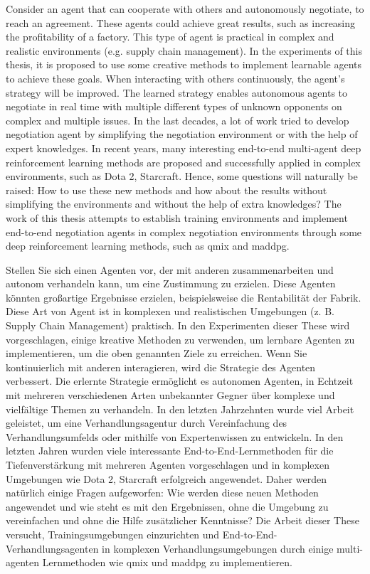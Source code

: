 
Consider an agent that can cooperate with others and autonomously negotiate, to reach an agreement. These agents could achieve great results, such as increasing the profitability of a factory. This type of agent is practical in complex and realistic environments (e.g. supply chain management). In the experiments of this thesis, it is proposed to use some creative methods to implement learnable agents to achieve these goals. When interacting with others continuously, the agent’s strategy will be improved. The learned strategy enables autonomous agents to negotiate in real time with multiple different types of unknown opponents on complex and multiple issues. In the last decades, a lot of work tried to develop negotiation agent by simplifying the negotiation environment or with the help of expert knowledges. In recent years, many interesting end-to-end multi-agent deep reinforcement learning methods are proposed and successfully applied in complex environments, such as Dota 2, Starcraft. Hence, some questions will naturally be raised: How to use these new methods and how about the results without simplifying the environments and without the help of extra knowledges? The work of this thesis attempts to establish training environments and implement end-to-end negotiation agents in complex negotiation environments through some deep reinforcement learning methods, such as \gls{qmix} and \gls{maddpg}.


Stellen Sie sich einen Agenten vor, der mit anderen zusammenarbeiten und autonom verhandeln kann, um eine Zustimmung zu erzielen. Diese Agenten könnten großartige Ergebnisse erzielen, beispielsweise die Rentabilität der Fabrik. Diese Art von Agent ist in komplexen und realistischen Umgebungen (z. B. Supply Chain Management) praktisch. In den Experimenten dieser These wird vorgeschlagen, einige kreative Methoden zu verwenden, um lernbare Agenten zu implementieren, um die oben genannten Ziele zu erreichen. Wenn Sie kontinuierlich mit anderen interagieren, wird die Strategie des Agenten verbessert. Die erlernte Strategie ermöglicht es autonomen Agenten, in Echtzeit mit mehreren verschiedenen Arten unbekannter Gegner über komplexe und vielfältige Themen zu verhandeln. In den letzten Jahrzehnten wurde viel Arbeit geleistet, um eine Verhandlungsagentur durch Vereinfachung des Verhandlungsumfelds oder mithilfe von Expertenwissen zu entwickeln. In den letzten Jahren wurden viele interessante End-to-End-Lernmethoden für die Tiefenverstärkung mit mehreren Agenten vorgeschlagen und in komplexen Umgebungen wie Dota 2, Starcraft erfolgreich angewendet. Daher werden natürlich einige Fragen aufgeworfen: Wie werden diese neuen Methoden angewendet und wie steht es mit den Ergebnissen, ohne die Umgebung zu vereinfachen und ohne die Hilfe zusätzlicher Kenntnisse? Die Arbeit dieser These versucht, Trainingsumgebungen einzurichten und End-to-End-Verhandlungsagenten in komplexen Verhandlungsumgebungen durch einige multi-agenten Lernmethoden wie \gls{qmix} und \gls{maddpg} zu implementieren.
